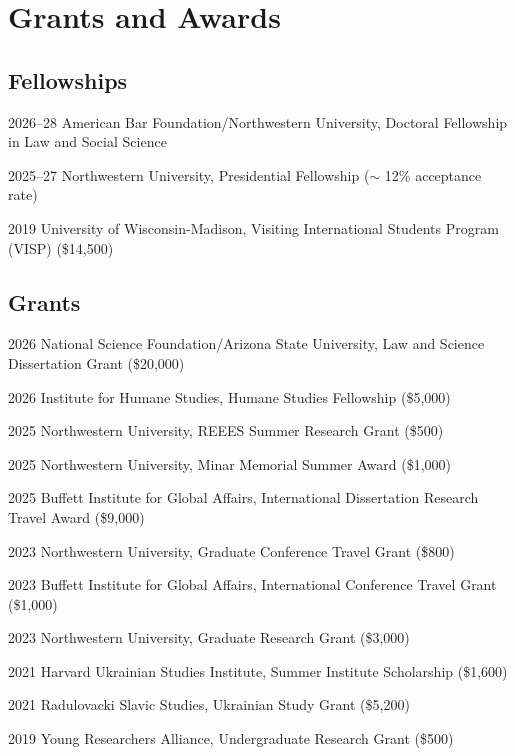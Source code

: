 \documentclass[11pt,letterpaper]{report}
\begin{document}
    \section*{Grants and Awards}



    \subsection*{Fellowships}

    \begin{tablist}
        \item[2026--28] \tab{}American Bar Foundation/Northwestern University, Doctoral Fellowship in Law and Social Science
        \item[2025--27] \tab{}Northwestern University, Presidential Fellowship ($\sim$ 12\% acceptance rate)
        \item[2019] \tab{}University of Wisconsin-Madison, Visiting International Students Program (VISP) (\$14,500)
    \end{tablist}

    \subsection*{Grants}

    \begin{tablist}
        \item[2026] \tab{}National Science Foundation/Arizona State University, Law and Science Dissertation Grant (\$20,000)
        \item[2026] \tab{}Institute for Humane Studies, Humane Studies Fellowship (\$5,000)
        \item[2025] \tab{}Northwestern University, REEES Summer Research Grant (\$500)
        \item[2025] \tab{}Northwestern University, Minar Memorial Summer Award (\$1,000)
        \item[2025] \tab{}Buffett Institute for Global Affairs, International Dissertation Research Travel Award (\$9,000)
        \item[2023] \tab{}Northwestern University, Graduate Conference Travel Grant (\$800)
        \item[2023] \tab{}Buffett Institute for Global Affairs, International Conference Travel Grant (\$1,000)
        \item[2023] \tab{}Northwestern University, Graduate Research Grant (\$3,000)
        \item[2021] \tab{}Harvard Ukrainian Studies Institute, Summer Institute Scholarship (\$1,600)
        \item[2021] \tab{}Radulovacki Slavic Studies, Ukrainian Study Grant (\$5,200)
        \item[2019] \tab{}Young Researchers Alliance, Undergraduate Research Grant (\$500)
    \end{tablist}
\end{document}
